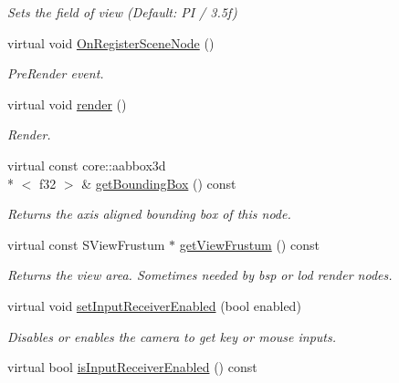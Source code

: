 \begin{DoxyCompactItemize}
\begin{DoxyCompactList}\small\item\em Sets the field of view (Default\-: P\-I / 3.\-5f) \end{DoxyCompactList}\item 
virtual void \hyperlink{classirr_1_1scene_1_1_c_camera_scene_node_a528e9f314c8ab9b75ec082caf5ecdaad}{On\-Register\-Scene\-Node} ()
\begin{DoxyCompactList}\small\item\em Pre\-Render event. \end{DoxyCompactList}\item 
virtual void \hyperlink{classirr_1_1scene_1_1_c_camera_scene_node_aaa4b74ecb932dfcc422c9af2e6c904a8}{render} ()
\begin{DoxyCompactList}\small\item\em Render. \end{DoxyCompactList}\item 
virtual const core\-::aabbox3d\\*
$<$ f32 $>$ \& \hyperlink{classirr_1_1scene_1_1_c_camera_scene_node_a00867ef7a5af4d42a884d1b2cb2f1cf4}{get\-Bounding\-Box} () const 
\begin{DoxyCompactList}\small\item\em Returns the axis aligned bounding box of this node. \end{DoxyCompactList}\item 
virtual const S\-View\-Frustum $\ast$ \hyperlink{classirr_1_1scene_1_1_c_camera_scene_node_af354b1802ce22c04233bba69835f4fbf}{get\-View\-Frustum} () const 
\begin{DoxyCompactList}\small\item\em Returns the view area. Sometimes needed by bsp or lod render nodes. \end{DoxyCompactList}\item 
virtual void \hyperlink{classirr_1_1scene_1_1_c_camera_scene_node_a02d7f9a9e12264d99b532db16c0479bd}{set\-Input\-Receiver\-Enabled} (bool enabled)
\begin{DoxyCompactList}\small\item\em Disables or enables the camera to get key or mouse inputs. \end{DoxyCompactList}\item 
\hypertarget{classirr_1_1scene_1_1_c_camera_scene_node_a7e6ac1b8d2aecdb445af9feae1279aab}{virtual bool \hyperlink{classirr_1_1scene_1_1_c_camera_scene_node_a7e6ac1b8d2aecdb445af9feae1279aab}{is\-Input\-Receiver\-Enabled} () const }\label{classirr_1_1scene_1_1_c_camera_scene_node_a7e6ac1b8d2aecdb445af9feae1279aab}


\end{DoxyCompactItemize}
